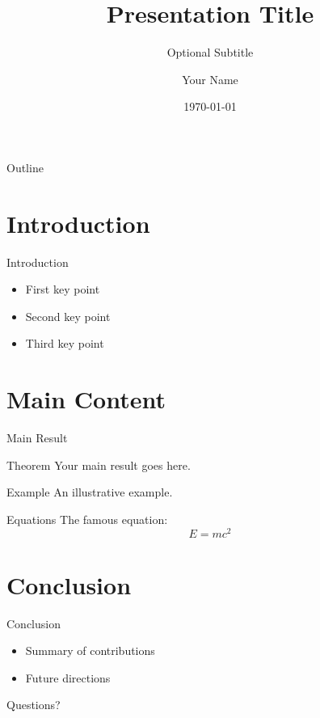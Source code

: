 \documentclass{beamer}
\title{Presentation Title}
\subtitle{Optional Subtitle}
\author{Your Name}
\institute{Your Institution}
\date{\today}
\begin{document}
\frame{\titlepage}

\begin{frame}{Outline}
  \tableofcontents
\end{frame}

\section{Introduction}

\begin{frame}{Introduction}
  \begin{itemize}
    \item First key point
    \item Second key point
    \item Third key point
  \end{itemize}
\end{frame}

\section{Main Content}

\begin{frame}{Main Result}
  \begin{block}{Theorem}
    Your main result goes here.
  \end{block}
  
  \begin{exampleblock}{Example}
    An illustrative example.
  \end{exampleblock}
\end{frame}

\begin{frame}{Equations}
  The famous equation:
  \[
    E = mc^2
  \]
\end{frame}

\section{Conclusion}

\begin{frame}{Conclusion}
  \begin{itemize}
    \item Summary of contributions
    \item Future directions
  \end{itemize}
  
  \bigskip
  
  \centerline{\Large Questions?}
\end{frame}
\end{document}
